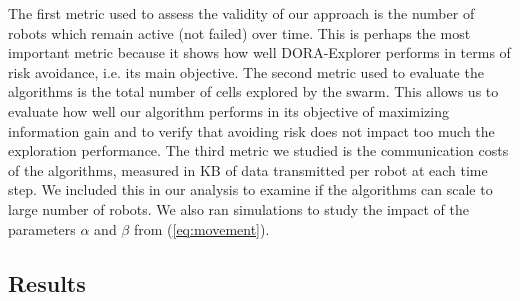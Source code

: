 

The first metric used to assess the validity of our approach is the
number of robots which remain active (not failed) over time. This is
perhaps the most important metric because it shows how well DORA-Explorer
performs in terms of risk avoidance, i.e. its main objective. The
second metric used to evaluate the algorithms is the total number of
cells explored by the swarm. This allows us to evaluate how well our
algorithm performs in its objective of maximizing information gain and
to verify that avoiding risk does not impact too much the exploration
performance. The third metric we studied is the communication costs of
the algorithms, measured in KB of data transmitted per robot at
each time step. We included this in our analysis to examine if
the algorithms can scale to large number of robots. We also ran simulations to study the impact of the parameters $\alpha$ and $\beta$ from (\ref{eq:movement}). 


\subsection{Results}


